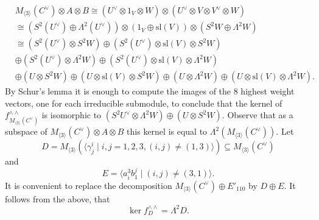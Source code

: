 \documentclass[12pt]{amsart}
\theoremstyle{definition}
\theoremstyle{remark}
\theoremstyle{definition}
\begin{document}
\begin{align*}
&M_{\langle 3\rangle}(C^\vee) \otimes A\otimes B \cong (U^\vee\otimes 1_V \otimes W)\otimes (U^\vee\otimes V \otimes V^\vee\otimes W) \\
&\cong (S^2(U^\vee)\oplus \Lambda^2(U^\vee))\otimes (1_V \oplus \mathrm{sl}(V))\otimes (S^2 W\oplus \Lambda^2 W)\\
&\cong (S^2(U^\vee) \otimes S^2W) \oplus (S^2(U^\vee)\otimes \mathrm{sl}(V) \otimes S^2W) \\
&\oplus (S^2(U^\vee) \otimes \Lambda^2W) \oplus (S^2(U^\vee)\otimes \mathrm{sl}(V) \otimes \Lambda^2W)\\
&\oplus (U \otimes S^2W) \oplus (U\otimes \mathrm{sl}(V) \otimes S^2W) \oplus (U \otimes \Lambda^2W) \oplus (U\otimes \mathrm{sl}(V) \otimes \Lambda^2W).
\end{align*}
By Schur's lemma it is enough to compute the images of the $8$ highest weight vectors, one for each irreducible submodule, to conclude that the kernel of $f^{\wedge \wedge}_{M_{\langle 3\rangle}(C^\vee)}$ is isomorphic to $(S^2U^\vee\otimes \Lambda^2W) \oplus (U\otimes S^2W)$. Observe that as a subspace of $M_{\langle 3\rangle}(C^\vee) \otimes A\otimes B$ this kernel is equal to 
$\Lambda^2(M_{\langle 3\rangle}(C^\vee))$. 
Let 
\[
D = M_{\langle 3\rangle}(\langle \gamma^i_j \mid i,j=1,2,3, (i,j)\ne  (1,3) \rangle) \subseteq M_{\langle 3\rangle}(C^\vee)
\]
and 
\[
E= \langle a^3_ib^j_1 \mid (i,j) \ne (3,1) \rangle.
\]
It is convenient to replace the decomposition $M_{\langle 3\rangle}(C^\vee)\oplus E'_{110}$ by $D \oplus E$.
It follows from the above, that
\begin{equation}\label{eq:kerD}
\ker f^{\wedge \wedge}_{D} =  \Lambda^2 D.
\end{equation}
\end{document}
